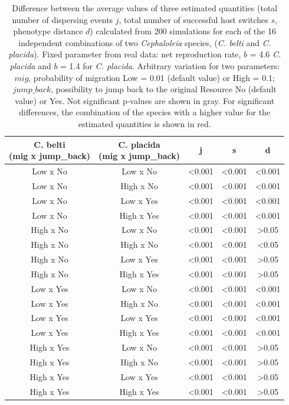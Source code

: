 \begin{table}[htbp]
\centering
\caption{Difference between the average values of three estimated quantities (total number of dispersing events $j$, total number of successful host switches $s$, phenotype distance $d$) calculated from 200 simulations for each of the 16 independent combinations of two \textit{Cephaloleia} species, (\textit{C. belti} and \textit{C. placida}). Fixed parameter from real data: net reproduction rate, $b$ = 4.6 \textit{C. placida}  and $b$ = 1.4  for \textit{C. placida}.
Arbitrary variation for two parameters: $mig$, probability of migration  Low = 0.01 (default value) or High = 0.1; $jump\_back$, possibility to jump back to the original Resource  No (default value) or Yes. Not significant p-values are shown in gray. For significant differences, the combination of the species with a higher value for the estimated quantities is shown in red.}
\label{tab:comparison1}
\begin{tabular}{|c|c|c|c|c|}
\hline

 \hline
 \makecell{\textbf{C. belti} \\ (mig x jump\_back)} & \makecell{\textbf{C. placida} \\ (mig x jump\_back)} & \textbf{j} & \textbf{s} & \textbf{d} \\
 \hline\hline
 \color{red}Low x No & Low x No &<0.001&<0.001&<0.001\\
 \color{red}Low x No & High x No&<0.001&<0.001&<0.001\\
 \color{red}Low x No & Low x Yes&<0.001&<0.001&<0.001\\
 \color{red}Low x No & High x Yes&<0.001&<0.001&<0.001\\
 \hline
 \color{red}High x No & Low x No&<0.001&<0.001&\color{gray}>0.05\\
 \color{red}High x No & High x No&<0.001&<0.001&<0.05\\
 \color{red}High x No & Low x Yes&<0.001&<0.001&\color{gray}>0.05\\
 \color{red}High x No & High x Yes&<0.001&<0.001&\color{gray}>0.05\\
 \hline
 \color{red}Low x Yes & Low x No&<0.001&<0.001&<0.001\\
 \color{red}Low x Yes&High x No&<0.001&<0.001&<0.001\\
 \color{red}Low x Yes&Low x Yes&<0.001&<0.001&<0.001\\
 \color{red}Low x Yes&High x Yes&<0.001&<0.001&<0.001\\
 \hline
 \color{red}High x Yes&Low x No&<0.001&<0.001&\color{gray}>0.05\\
 \color{red}High x Yes&High x No&<0.001&<0.001&\color{gray}>0.05\\
 \color{red}High x Yes&Low x Yes&<0.001&<0.001&\color{gray}>0.05\\
 \color{red}High x Yes&High x Yes&<0.001&<0.001&\color{gray}>0.05\\
  \hline
 \end{tabular}
 \end{table}
 

